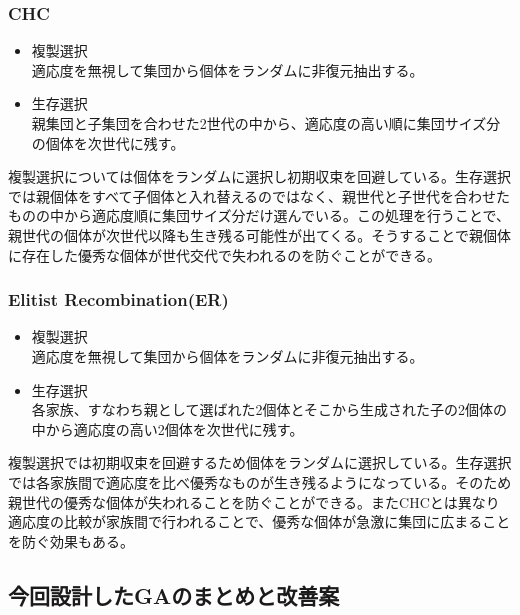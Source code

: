 \subsubsection{CHC}
\begin{itemize}
\item{複製選択}\\
適応度を無視して集団から個体をランダムに非復元抽出する。
\item{生存選択}\\
親集団と子集団を合わせた2世代の中から、適応度の高い順に集団サイズ分の個体を次世代に残す。
\end{itemize}
複製選択については個体をランダムに選択し初期収束を回避している。生存選択では親個体をすべて子個体と入れ替えるのではなく、親世代と子世代を合わせたものの中から適応度順に集団サイズ分だけ選んでいる。この処理を行うことで、親世代の個体が次世代以降も生き残る可能性が出てくる。そうすることで親個体に存在した優秀な個体が世代交代で失われるのを防ぐことができる。

\subsubsection{Elitist Recombination(ER)}
\begin{itemize}
\item{複製選択}\\
適応度を無視して集団から個体をランダムに非復元抽出する。
\item{生存選択}\\
各家族、すなわち親として選ばれた2個体とそこから生成された子の2個体の中から適応度の高い2個体を次世代に残す。
\end{itemize}
複製選択では初期収束を回避するため個体をランダムに選択している。生存選択では各家族間で適応度を比べ優秀なものが生き残るようになっている。そのため親世代の優秀な個体が失われることを防ぐことができる。またCHCとは異なり適応度の比較が家族間で行われることで、優秀な個体が急激に集団に広まることを防ぐ効果もある。

\subsection{今回設計したGAのまとめと改善案}
